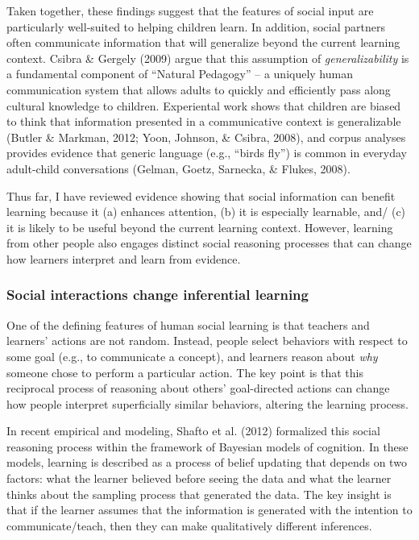 \documentclass[a4paper,man,apacite,floatsintext]{apa6}
\begin{document}
Taken together, these findings suggest that the features of social input
are particularly well-suited to helping children learn. In addition,
social partners often communicate information that will generalize
beyond the current learning context. Csibra \& Gergely (2009) argue that
this assumption of \emph{generalizability} is a fundamental component of
``Natural Pedagogy'' -- a uniquely human communication system that
allows adults to quickly and efficiently pass along cultural knowledge
to children. Experiental work shows that children are biased to think
that information presented in a communicative context is generalizable
(Butler \& Markman, 2012; Yoon, Johnson, \& Csibra, 2008), and corpus
analyses provides evidence that generic language (e.g., ``birds fly'')
is common in everyday adult-child conversations (Gelman, Goetz,
Sarnecka, \& Flukes, 2008).

Thus far, I have reviewed evidence showing that social information can
benefit learning because it (a) enhances attention, (b) it is especially
learnable, and/ (c) it is likely to be useful beyond the current
learning context. However, learning from other people also engages
distinct social reasoning processes that can change how learners
interpret and learn from evidence.

\subsubsection{Social interactions change inferential
learning}\label{social-interactions-change-inferential-learning}

One of the defining features of human social learning is that teachers
and learners' actions are not random. Instead, people select behaviors
with respect to some goal (e.g., to communicate a concept), and learners
reason about \emph{why} someone chose to perform a particular action.
The key point is that this reciprocal process of reasoning about others'
goal-directed actions can change how people interpret superficially
similar behaviors, altering the learning process.

In recent empirical and modeling, Shafto et al. (2012) formalized this
social reasoning process within the framework of Bayesian models of
cognition. In these models, learning is described as a process of belief
updating that depends on two factors: what the learner believed before
seeing the data and what the learner thinks about the sampling process
that generated the data. The key insight is that if the learner assumes
that the information is generated with the intention to
communicate/teach, then they can make qualitatively different
inferences.
\end{document}
